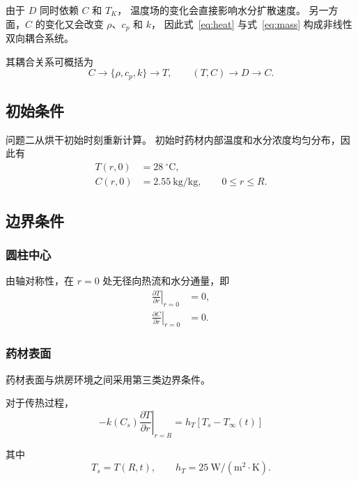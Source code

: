 \documentclass[UTF8,a4paper,12pt]{ctexart}
\begin{document}
由于 $D$ 同时依赖 $C$ 和 $T_K$，
温度场的变化会直接影响水分扩散速度。
另一方面，$C$ 的变化又会改变 $\rho$、$c_p$ 和 $k$，
因此式~\eqref{eq:heat} 与式~\eqref{eq:mass} 构成非线性双向耦合系统。

其耦合关系可概括为
\begin{equation}
C
\longrightarrow
\{\rho,c_p,k\}
\longrightarrow
T,
\qquad
(T,C)
\longrightarrow
D
\longrightarrow
C.
\end{equation}

\subsection{初始条件}

问题二从烘干初始时刻重新计算。
初始时药材内部温度和水分浓度均匀分布，因此有
\begin{align}
T(r,0) &= 28~^\circ\mathrm{C}, \\
C(r,0) &= 2.55~\mathrm{kg/kg},
\qquad 0\le r\le R.
\end{align}

\subsection{边界条件}

\subsubsection{圆柱中心}

由轴对称性，在 $r=0$ 处无径向热流和水分通量，即
\begin{align}
\left.
\frac{\partial T}{\partial r}
\right|_{r=0}
&=0, \\
\left.
\frac{\partial C}{\partial r}
\right|_{r=0}
&=0.
\end{align}

\subsubsection{药材表面}

药材表面与烘房环境之间采用第三类边界条件。

对于传热过程，
\begin{equation}
\boxed{
-k(C_s)
\left.
\frac{\partial T}{\partial r}
\right|_{r=R}
=
h_T
\left[
T_s-T_{\infty}(t)
\right]
}
\label{eq:heat_boundary}
\end{equation}

其中
\begin{equation}
T_s=T(R,t),
\qquad
h_T=25~\mathrm{W/(m^2\cdot K)}.
\end{equation}
\end{document}
